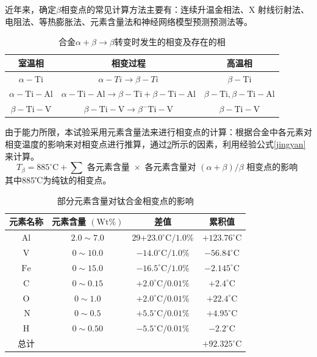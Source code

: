 近年来，确定$ \beta $相变点的常见计算方法\cite{zhuhongTaihejinaVxiangbiandiandejizhongceshifangfatantao2013}主要有：连续升温金相法、X 射线衍射法、电阻法、等热膨胀法、元素含量法和神经网络模型预测预测法\cite{renchiqiangGurongshixiaoduiTC4taihejinxianweizuzhihelixuexingnengdeyingxiang2022}等。
\begin{table}[htbp]
	\centering
	\caption{\ti 合金$ \alpha+\beta \to \beta $转变时发生的相变及存在的相}
	\label{sec:Tc4betachange}
	\begin{tabular}{ccc}
		\toprule 室温相 & 相变过程 & 高温相 \\
		\midrule$\alpha-\mathrm{Ti}$ & $\alpha-T i \rightarrow \beta-T i$ & $\beta-\mathrm{Ti}$ \\
		$\alpha-\mathrm{Ti}-\mathrm{Al}$ & $\alpha-\mathrm{Ti}-\mathrm{Al} \rightarrow \beta-\mathrm{Ti}+\beta-\mathrm{Ti}-\mathrm{Al}$ & $\beta-\mathrm{Ti}, \beta-\mathrm{Ti}-\mathrm{Al}$ \\
		$\beta- \mathrm{Ti}-\mathrm{V}$ & $\beta-\mathrm{Ti}-\mathrm{V} \rightarrow \beta^{-} \mathrm{Ti}-\mathrm{V}$ & $\beta-\mathrm{Ti}-\mathrm{V}$ \\
		\bottomrule
	\end{tabular}
\end{table}

由于能力所限，本试验采用元素含量法来进行相变点的计算：根据合金中各元素对相变温度的影响来对相变点进行推算，通过\ref{sec:chem4ti}所示\cite{ananyaLocationBasedIntelligent2011}的因素，利用经验公式\ref{jingyan}来计算。
\begin{equation}
	T_\beta=885^{\circ} \mathrm{C}+\sum \text { 各元素含量 } \times \text { 各元素含量对 }(\alpha+\beta) / \beta \text { 相变点的影响 }
	\label{jingyan}
\end{equation}
其中885℃为纯钛的相变点。
\begin{table}[htbp]
	\centering
	\caption{部分元素含量对钛合金相变点的影响}
	\label{sec:chem4ti}
	\begin{tabular}{cccc}
		\hline 元素名称 & 元素含量 $(\mathrm{Wt} \%)$ & 差值&累积值 \\
		\hline $\mathrm{Al}$ & $2.0 \sim 7.0$ & 29+$23.0^{\circ} \mathrm{C} / 1.0 \%$ & $+123.76^{\circ} \mathrm{C}$ \\
		$\mathrm{V}$ & $0 \sim 10.0$ & $-14.0^{\circ} \mathrm{C} / 1.0 \%$ & $-56.84^{\circ} \mathrm{C}$ \\
		$\mathrm{Fe}$ & $0 \sim 15.0$ & $-16.5^{\circ} \mathrm{C} / 1.0 \%$ & $-2.145^{\circ} \mathrm{C}$
		 \\
		$\mathrm{C}$ & $0 \sim 0.15$ & $+2.0^{\circ} \mathrm{C} / 0.01 \%$ &$ +2.4^{\circ} \mathrm{C} $\\
		$\mathrm{O}$ & $0 \sim 1.0$ & $+2.0^{\circ} \mathrm{C} / 0.01 \%$& $ +22.4^{\circ} \mathrm{C} $\\
		$\mathrm{~N}$ & $0 \sim 0.5$ & $+5.5^{\circ} \mathrm{C} / 0.01 \%$& $ +4.95^{\circ} \mathrm{C} $\\
		$\mathrm{H}$ & $0 \sim 0.50$ & $-5.5^{\circ} \mathrm{C} / 0.01 \%$ &$ -2.2^{\circ} \mathrm{C} $\\
		总计&&&$ +92.325^{\circ} \mathrm{C} $\\
		\hline
	\end{tabular}
\end{table}


